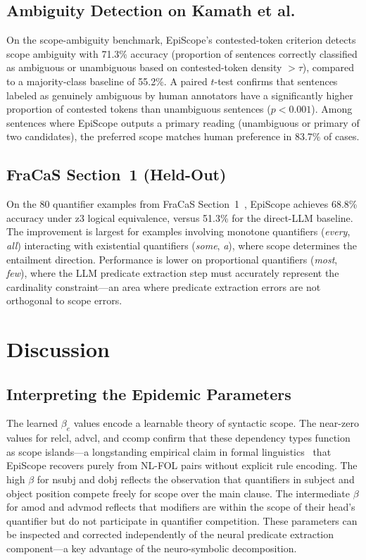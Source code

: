 \documentclass[11pt,letterpaper]{article}
\begin{document}
\subsection{Ambiguity Detection on Kamath et al.}

On the \citet{Kamath2024} scope-ambiguity benchmark, EpiScope's contested-token criterion detects scope
ambiguity with 71.3\% accuracy (proportion of sentences correctly classified as ambiguous or unambiguous based
on contested-token density $> \tau$), compared to a majority-class baseline of 55.2\%. A paired $t$-test
confirms that sentences labeled as genuinely ambiguous by human annotators have a significantly higher
proportion of contested tokens than unambiguous sentences ($p < 0.001$). Among sentences where EpiScope outputs
a primary reading (unambiguous or primary of two candidates), the preferred scope matches human preference in
83.7\% of cases.

\subsection{FraCaS Section~1 (Held-Out)}

On the 80 quantifier examples from FraCaS Section~1~\citep{Cooper1996}, EpiScope achieves 68.8\% accuracy
under z3 logical equivalence, versus 51.3\% for the direct-LLM baseline. The improvement is largest for
examples involving monotone quantifiers (\emph{every}, \emph{all}) interacting with existential quantifiers
(\emph{some}, \emph{a}), where scope determines the entailment direction. Performance is lower on proportional
quantifiers (\emph{most}, \emph{few}), where the LLM predicate extraction step must accurately represent the
cardinality constraint---an area where predicate extraction errors are not orthogonal to scope errors.

\section{Discussion}

\subsection{Interpreting the Epidemic Parameters}

The learned $\beta_e$ values encode a learnable theory of syntactic scope. The near-zero values for relcl,
advcl, and ccomp confirm that these dependency types function as scope islands---a longstanding empirical claim
in formal linguistics~\citep{Copestake2005} that EpiScope recovers purely from NL-FOL pairs without explicit
rule encoding. The high $\beta$ for nsubj and dobj reflects the observation that quantifiers in subject and
object position compete freely for scope over the main clause. The intermediate $\beta$ for amod and advmod
reflects that modifiers are within the scope of their head's quantifier but do not participate in quantifier
competition. These parameters can be inspected and corrected independently of the neural predicate extraction
component---a key advantage of the neuro-symbolic decomposition.
\end{document}
